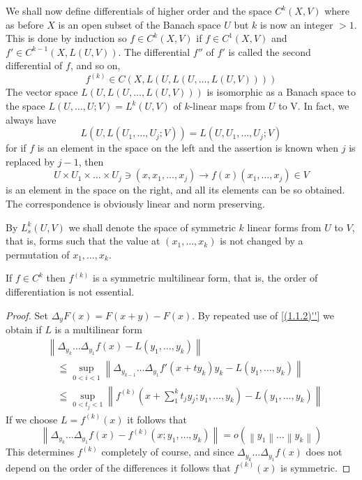 We shall now define differentials of higher order and the space $C^{k}(X, V)$ where as before $X$ is an open subset of the Banach space $U$ but $k$ is now an integer $>1$. This is done by induction so $f \in C^{k}(X, V)$ if $f \in C^{1}(X, V)$ and $f' \in C^{k-1}(X, L(U, V))$. The differential $f''$ of $f'$ is called the second differential of $f$, and so on,
\[
	f^{(k)} \in C( X, L( U, L( U, \ldots, L(U, V) ) ) )
\]
The vector space $L(U, L(U, \ldots, L(U, V)))$ is isomorphic as a Banach space to the space $L(U, \ldots, U ; V)=L^{k}(U, V)$ of $k$-linear maps from $U$ to V. In fact, we always have
\[
	L\left(U, L\left(U_{1}, \ldots, U_{j} ; V\right)\right)=L\left(U, U_{1}, \ldots, U_{j} ; V\right)
\]
for if $f$ is an element in the space on the left and the assertion is known when $j$ is replaced by $j-1$, then
\[
	U \times U_{1} \times \ldots \times U_{j} \ni\left(x, x_{1}, \ldots, x_{j}\right) \rightarrow f(x)\left(x_{1}, \ldots, x_{j}\right) \in V
\]
is an element in the space on the right, and all its elements can be so obtained. The correspondence is obviously linear and norm preserving.

By $L_{s}^{k}(U, V)$ we shall denote the space of symmetric $k$ linear forms from $U$ to $V$, that is, forms such that the value at $\left(x_{1}, \ldots, x_{k}\right)$ is not changed by a permutation of $x_{1}, \ldots, x_{k}$.

\begin{theorem}
    If $f \in C^{k}$ then $f^{(k)}$ is a symmetric multilinear form, that is, the order of differentiation is not essential.
\end{theorem}
\begin{proof}
    Set $\Delta_{y} F(x)=F(x+y)-F(x)$. By repeated use of \eqref{(1.1.2)''} we obtain if $L$ is a multilinear form
\[
	\begin{aligned}
		 & \left\|\Delta_{y_{k}} \ldots \Delta_{y_{1}} f(x)-L(y_{1}, \ldots, y_{k})\right\|                                                              \\
		 & \quad \leqq \sup _{0<i<1}\left\|\Delta_{y_{k-1}} \ldots \Delta_{y_{1}} f'(x+t y_{k}) y_{k}-L(y_{1}, \ldots, y_{k})\right\| \\
		 & \quad \leqq \sup _{0<t_{j}<1}\left\|f^{(k)}\left(x+\sum_{1}^{k} t_{j} y_{j} ; y_{1}, \ldots, y_{k}\right)-L(y_{1}, \ldots, y_{k})\right\|
	\end{aligned}
\]
If we choose $L=f^{(k)}(x)$ it follows that
\begin{equation}
    \label{(1.1.6)}
    \left\|\Delta_{y_{k}} \ldots \Delta_{y_{1}} f(x)-f^{(k)}(x ; y_{1}, \ldots, y_{k})\right\|=o\left(\left\|y_{1}\right\| \ldots\left\|y_{k}\right\|\right)
\end{equation}
This determines $f^{(k)}$ completely of course, and since $\Delta_{y_k} \ldots \Delta_{y_{1}} f(x)$ does not depend on the order of the differences it follows that $f^{(k)}(x)$ is symmetric.
\end{proof}

